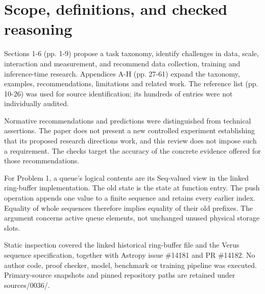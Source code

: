 \documentclass[10pt]{article}
\begin{document}
\section*{Scope, definitions, and checked reasoning}
Sections 1-6 (pp. 1-9) propose a task taxonomy, identify challenges in data, scale, interaction and measurement, and recommend data collection, training and inference-time research. Appendices A-H (pp. 27-61) expand the taxonomy, examples, recommendations, limitations and related work. The reference list (pp. 10-26) was used for source identification; its hundreds of entries were not individually audited.\par
Normative recommendations and predictions were distinguished from technical assertions. The paper does not present a new controlled experiment establishing that its proposed research directions work, and this review does not impose such a requirement. The checks target the accuracy of the concrete evidence offered for those recommendations.\par
For Problem 1, a queue’s logical contents are its Seq-valued view in the linked ring-buffer implementation. The old state is the state at function entry. The push operation appends one value to a finite sequence and retains every earlier index. Equality of whole sequences therefore implies equality of their old prefixes. The argument concerns active queue elements, not unchanged unused physical storage slots.\par
Static inspection covered the linked historical ring-buffer file and the Verus sequence specification, together with Astropy issue \#14181 and PR \#14182. No author code, proof checker, model, benchmark or training pipeline was executed. Primary-source snapshots and pinned repository paths are retained under sources/0036/.\par
\end{document}
